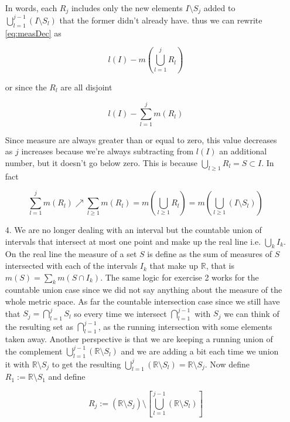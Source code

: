 \documentclass[oneside]{book}
\begin{document}
\begin{enumerate}
In words, each $R_j$ includes only the new elements $I \setminus S_j$ added to $\bigcup_{l=1}^{j-1} (I \setminus S_l)$ that the former didn't already have. thus we can rewrite \ref{eq:measDec} as

\begin{equation}
l(I) - m\left( \bigcup_{l=1}^j R_l \right)
\end{equation}

or since the $R_l$ are all disjoint

\begin{equation}
l(I) - \sum_{l=1}^j m\left(  R_l \right)
\end{equation}

Since measure are always greater than or equal to zero, this value decreases as $j$ increases because we're always subtracting from $l(I)$ an additional number, but it doesn't go below zero. This is because $\bigcup_{l \ge 1} R_l = S \subset I$. In fact 

\begin{equation}
\sum_{l=1}^j m\left(  R_l \right) \nearrow \sum_{l \ge1} m\left(  R_l \right) = m \left(\bigcup_{l \ge 1} R_l \right) = m \left(\bigcup_{l \ge 1} (I \setminus S_l) \right)
\end{equation}

\item[4.]  We are no longer dealing with an interval but the countable union of intervals that intersect at most one point and make up the real line i.e. $\bigcup_k I_k$. On the real line the measure of a set $S$ is define as the sum of measures of $S$ intersected with each of the intervals $I_k$ that make up $\mathbb{R}$, that is $m(S)=\sum_k m(S \cap I_k)$. The same logic for exercise 2 works for the countable union case since we did not say anything about the measure of the whole metric space. As far the countable intersection case since we still have that $S_j = \bigcap_{l=1}^j S_l$ so every time we intersect $\bigcap_{l=1}^{j-1}$ with $S_j$ we can think of the resulting set as $\bigcap_{l=1}^{j-1}$, as the running intersection with some elements taken away. Another perspective is that we are keeping a running union of the complement $\bigcup_{l=1}^{j-1} (\mathbb{R} \setminus S_l)$ and we are adding a bit each time we union it with $\mathbb{R} \setminus S_j$ to get the resulting $\bigcup_{l=1}^{j} (\mathbb{R} \setminus S_l)=\mathbb{R} \setminus S_j$. Now define $R_1 := \mathbb{R} \setminus S_1$ and define

\begin{equation}
R_j := (\mathbb{R} \setminus S_j) \setminus \left[ \bigcup_{l=1}^{j-1} (\mathbb{R} \setminus S_l) \right]
\end{equation}


\end{enumerate}
\end{document}
